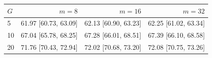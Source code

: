 \begin{tabular}{@{}lrrr@{}}
\toprule
$G$ & $m=8$ & $m=16$ & $m=32$ \\
\midrule
5 & 61.97 [60.73, 63.09] & 62.13 [60.90, 63.23] & 62.25 [61.02, 63.34] \\
10 & 67.04 [65.78, 68.25] & 67.28 [66.01, 68.51] & 67.39 [66.10, 68.58] \\
20 & 71.76 [70.43, 72.94] & 72.02 [70.68, 73.20] & 72.08 [70.75, 73.26] \\
\bottomrule
\end{tabular}
